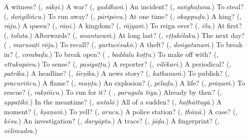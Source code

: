 \begin{tcolorbox}[breakable,colback=teal!4,colframe=teal!35!black,title={Before you move on}]
A witness? (\textbf{}, \emph{sākṣi}.) A war? (\textbf{}, \emph{yuddhaṁ}.) An incident? (\textbf{}, \emph{saṅghaṭana}.) To steal? (\textbf{}, \emph{doṅgiliñcu}.) To run away? (\textbf{}, \emph{pāripōvu}.) At one time? (\textbf{}, \emph{okappuḍu}.) A king? (\textbf{}, \emph{rāju}.) A queen? (\textbf{}, \emph{rāṇi}.) A kingdom? (\textbf{}, \emph{rājyaṁ}.) To reign over? (\textbf{}, \emph{ēlu}.) At first? (\textbf{}, \emph{toluta}.) Afterwards? (\textbf{}, \emph{anantaraṁ}.) At long last? (\textbf{}, \emph{eṭṭakēlaku}.) The next day? (\textbf{ }, \emph{marusaṭi rōju}.) To recall? (\textbf{}, \emph{gurtucēsukō}.) A theft? (\textbf{}, \emph{doṅgatanaṁ}.) To break in? (\textbf{}, \emph{corabaḍu}.) To break open? (\textbf{ }, \emph{baddalu koṭṭu}.) To make off with? (\textbf{}, \emph{ettukupōvu}.) To sense? (\textbf{}, \emph{pasigaṭṭu}.) A reporter? (\textbf{}, \emph{vilēkari}.) A periodical? (\textbf{}, \emph{patrika}.) A headline? (\textbf{}, \emph{śīrṣika}.) A news story? (\textbf{}, \emph{kathanaṁ}.) To publish? (\textbf{}, \emph{pracuriñcu}.) A flame? (\textbf{}, \emph{maṇṭa}.) An explosion? (\textbf{}, \emph{pēluḍu}.) A life? (\textbf{}, \emph{prāṇaṁ}.) To rescue? (\textbf{}, \emph{rakṣiñcu}.) To run for it? (\textbf{ }, \emph{parugulu tīyu}.) Already by then? (\textbf{}, \emph{appaṭikē}.) In the meantime? (\textbf{}, \emph{antalō}.) All of a sudden? (\textbf{}, \emph{haṭhāttugā}.) A moment? (\textbf{}, \emph{kṣaṇaṁ}.) To yell? (\textbf{}, \emph{arucu}.) A police station? (\textbf{}, \emph{ṭhāṇā}.) A case? (\textbf{}, \emph{kēsu}.) An investigation? (\textbf{}, \emph{daryāptu}.) A trace? (\textbf{}, \emph{jāḍa}.) A fingerprint? (\textbf{}, \emph{vēlimudra}.)
\end{tcolorbox}
